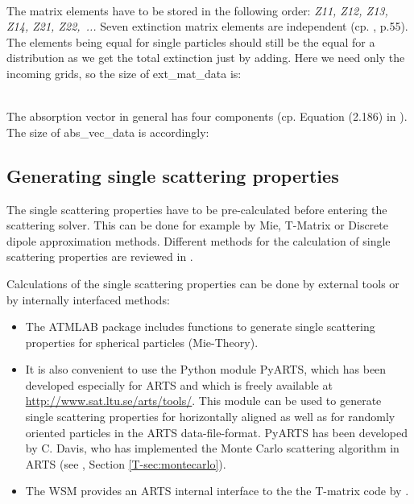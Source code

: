 \\
The matrix elements have to be stored in the following order: {\sl Z11,
  Z12, Z13, Z14, Z21, Z22,~...} Seven extinction matrix elements are
independent (cp. \citet{Mishchenko:02}, p.55). The elements being equal for
single particles should still be the equal for a distribution as we
get the total extinction just by adding. Here we need only the
incoming grids, so the size of ext\_mat\_data is: 

\\
The absorption vector in general has four components (cp. Equation
(2.186) in \citet{Mishchenko:02}). The size of abs\_vec\_data is
accordingly: 


\subsection{Generating single scattering properties}
The single scattering properties have to be pre-calculated before entering the
scattering solver. This can be done for example by Mie, T-Matrix or
Discrete dipole approximation methods. Different methods for the calculation of
single scattering properties are reviewed in \citet{emde05:_phdthesis}.

Calculations of the single scattering properties can be done by external tools
or by internally interfaced methods:
\begin{itemize}
\item
The ATMLAB package includes functions to generate single scattering
properties for spherical particles (Mie-Theory). 
\item
It is also convenient to use the Python module PyARTS, which has been
developed especially for ARTS and which is freely available at
\href{http://www.sat.ltu.se/arts/tools/}
{\url{http://www.sat.ltu.se/arts/tools/}}. This
module can be used to generate single scattering properties for
horizontally aligned as well as for randomly oriented particles in the
ARTS data-file-format. PyARTS has been developed by C. Davis, who has
implemented the Monte Carlo scattering algorithm in ARTS (see
\theory, Section \ref{T-sec:montecarlo}).
\item
The WSM  provides an ARTS internal interface
to the the T-matrix code by \citet{Mishchenko:02}.
\end{itemize}

